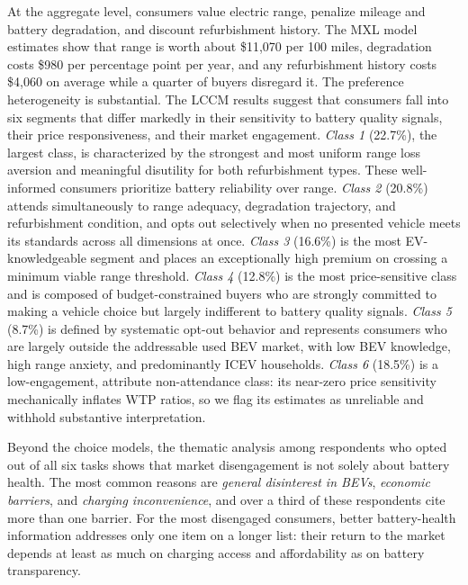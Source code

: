 \documentclass[a4paper,fleqn]{cas-sc}   %
\begin{document}
At the aggregate level, consumers value electric range, penalize mileage and battery degradation, and discount refurbishment history. The MXL model estimates show that range is worth about \$11,070 per 100 miles, degradation costs \$980 per percentage point per year, and any refurbishment history costs \$4,060 on average while a quarter of buyers disregard it. The preference heterogeneity is substantial. The LCCM results suggest that consumers fall into six segments that differ markedly in their sensitivity to battery quality signals, their price responsiveness, and their market engagement. 
\textit{Class 1} (22.7\%), the largest class, is characterized by the strongest and most uniform range loss aversion and meaningful disutility for both refurbishment types. These well-informed consumers prioritize battery reliability over range. 
\textit{Class 2} (20.8\%) attends simultaneously to range adequacy, degradation trajectory, and refurbishment condition, and opts out selectively when no presented vehicle meets its standards across all dimensions at once. 
\textit{Class 3} (16.6\%) is the most EV-knowledgeable segment and places an exceptionally high premium on crossing a minimum viable range threshold. 
\textit{Class 4} (12.8\%) is the most price-sensitive class and is composed of budget-constrained buyers who are strongly committed to making a vehicle choice but largely indifferent to battery quality signals. 
\textit{Class 5} (8.7\%) is defined by systematic opt-out behavior and represents consumers who are largely outside the addressable used BEV market, with low BEV knowledge, high range anxiety, and predominantly ICEV households. 
\textit{Class 6} (18.5\%) is a low-engagement, attribute non-attendance class: its near-zero price sensitivity mechanically inflates WTP ratios, so we flag its estimates as unreliable and withhold substantive interpretation.

Beyond the choice models, the thematic analysis among respondents who opted out of all six tasks shows that market disengagement is not solely about battery health. The most common reasons are \textit{general disinterest in BEVs}, \textit{economic barriers}, and \textit{charging inconvenience}, and over a third of these respondents cite more than one barrier. For the most disengaged consumers, better battery-health information addresses only one item on a longer list: their return to the market depends at least as much on charging access and affordability as on battery transparency.
\end{document}
